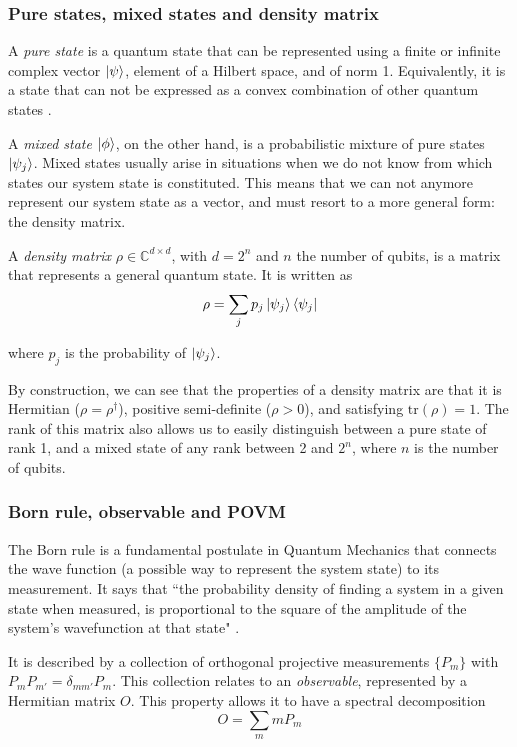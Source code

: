 \documentclass[12pt]{memoir}
\newcommand{\tr}{\text{tr}}
\begin{document}
\subsubsection*{Pure states, mixed states and density matrix}

A \textit{pure state} is a quantum state that can be represented using a finite or infinite complex vector $\ket \psi$, element of a Hilbert space, and of norm 1. Equivalently, it is a state that can not be expressed as a convex combination of other quantum states \cite{wiki:density-matrix}.\medbreak


A \textit{mixed state} $\ket \phi$, on the other hand, is a probabilistic mixture of pure states $\ket {\psi_j}$. Mixed states usually arise in situations when we do not know from which states our system state is constituted. This means that we can not anymore represent our system state as a vector, and must resort to a more general form: the density matrix.\medbreak


A \textit{density matrix} $\rho \in \mathbb{C}^{d \times d}$, with $d = 2^n$ and $n$ the number of qubits, is a matrix that represents a general quantum state. It is written as
\begin{equation}
    \rho = \sum_{j} p_j \ket{\psi_j} \bra{\psi_j}
\end{equation}

where $p_j$ is the probability of $\ket{\psi_j}$.\medbreak


By construction, we can see that the properties of a density matrix are that it is Hermitian ($\rho = \rho^{\dagger}$), positive semi-definite ($\rho > 0$), and satisfying $\tr(\rho) = 1$. The rank of this matrix also allows us to easily distinguish between a pure state of rank 1, and a mixed state of any rank between 2 and $2^n$, where $n$ is the number of qubits.


\subsubsection*{Born rule, observable and POVM}


The Born rule is a fundamental postulate in Quantum Mechanics that connects the wave function (a possible way to represent the system state) to its measurement. It says that ``the probability density of finding a system in a given state when measured, is proportional to the square of the amplitude of the system's wavefunction at that state" \cite{wiki:born-rule}.\medbreak

It is described by a collection of orthogonal projective measurements $\{P_m\}$ with $P_mP_{m'}=\delta_{mm'}P_m$. This collection relates to an \textit{observable}, represented by a Hermitian matrix $O$. This property allows it to have a spectral decomposition
\begin{equation}
    O = \sum_m m P_m
\end{equation}
\end{document}

